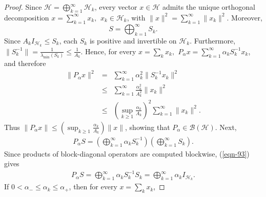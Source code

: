 \documentclass[12pt,titlepage]{amsart}
\theoremstyle{definition}
\theoremstyle{remark}
\begin{document}
\begin{proof}
Since $\mathcal H=\bigoplus_{k=1}^{\infty}\mathcal H_k$, every
vector $x\in\mathcal H$ admits the unique orthogonal decomposition
$x=\sum_{k=1}^{\infty}x_k, \,\ x_k\in\mathcal H_k$, with $\|x\|^2
= \sum_{k=1}^{\infty}\|x_k\|^2$. Moreover, $$S=
\bigoplus_{k=1}^{\infty}S_k.$$ Since $A_kI_{\mathcal H_k} \le
S_k$, each $S_k$ is positive and invertible on $\mathcal H_k$.
Furthermore, $\|S_k^{-1}\| = \frac1{\lambda_{\min}(S_k)} \le
\frac1{A_k}$. Hence, for every $x=\sum_kx_k, \,\ P_\alpha x =
\sum_{k=1}^{\infty} \alpha_kS_k^{-1}x_k$, and therefore
\begin{eqnarray*}
\|P_\alpha x\|^2 &=& \sum_{k=1}^{\infty} \alpha_k^2
\|S_k^{-1}x_k\|^2 \\ &\le& \sum_{k=1}^{\infty}
\frac{\alpha_k^2}{A_k^2} \|x_k\|^2 \\ &\le& \left( \sup_{k\ge1}
\frac{\alpha_k}{A_k} \right)^2 \sum_{k=1}^{\infty}\|x_k\|^2.
\end{eqnarray*}
Thus $\|P_\alpha x\| \le \left( \sup_{k\ge1} \frac{\alpha_k}{A_k}
\right)\|x\|$, showing that $P_\alpha\in\mathcal B(\mathcal H)$.
Next,
\begin{eqnarray} \label{eqn-93}
P_\alpha S = \left( \bigoplus_{k=1}^{\infty} \alpha_kS_k^{-1}
\right) \left( \bigoplus_{k=1}^{\infty}S_k \right).
\end{eqnarray}
Since products of block-diagonal operators are computed blockwise,
(\ref{eqn-93}) gives
\begin{eqnarray*}
P_\alpha S = \bigoplus_{k=1}^{\infty}
\alpha_kS_k^{-1}S_k=\bigoplus_{k=1}^{\infty} \alpha_kI_{\mathcal
H_k}.
\end{eqnarray*}
If $0<\alpha_-\le\alpha_k\le\alpha_+$, then for every
$x=\sum_kx_k$,


\end{proof}
\end{document}

